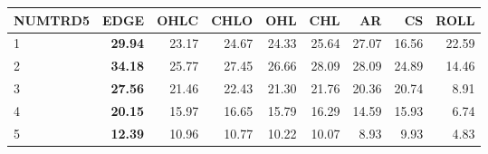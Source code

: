 \begin{table}[ht]
\centering
\begin{tabular}{lrrrrrrrr}
  \hline
NUMTRD5 & EDGE & OHLC & CHLO & OHL & CHL & AR & CS & ROLL \\ 
  \hline
1 & \textbf{29.94} & 23.17 & 24.67 & 24.33 & 25.64 & 27.07 & 16.56 & 22.59 \\ 
  2 & \textbf{34.18} & 25.77 & 27.45 & 26.66 & 28.09 & 28.09 & 24.89 & 14.46 \\ 
  3 & \textbf{27.56} & 21.46 & 22.43 & 21.30 & 21.76 & 20.36 & 20.74 & 8.91 \\ 
  4 & \textbf{20.15} & 15.97 & 16.65 & 15.79 & 16.29 & 14.59 & 15.93 & 6.74 \\ 
  5 & \textbf{12.39} & 10.96 & 10.77 & 10.22 & 10.07 & 8.93 & 9.93 & 4.83 \\ 
   \hline
\end{tabular}
\end{table}
